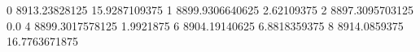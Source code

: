0 8913.23828125 15.9287109375
1 8899.9306640625 2.62109375
2 8897.3095703125 0.0
4 8899.3017578125 1.9921875
6 8904.19140625 6.8818359375
8 8914.0859375 16.7763671875
